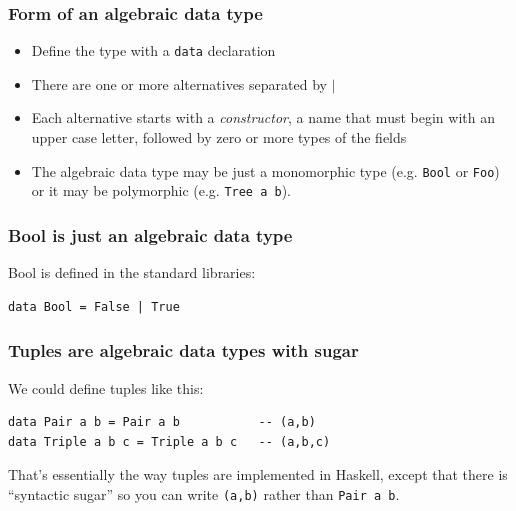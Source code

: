 \documentclass{beamer}
\begin{document}
\begin{frame}
\frametitle{Form of an algebraic data type}

\begin{itemize}
\item Define the type with a \texttt{data} declaration
\item There are one or more alternatives separated by $\mid$
\item Each alternative starts with a \emph{constructor}, a name
  that must begin with an upper case letter, followed by zero or
  more types of the fields
\item The algebraic data type may be just a monomorphic type
  (e.g. \texttt{Bool} or \texttt{Foo}) or it may be polymorphic (e.g. \texttt{Tree a b}).
\end{itemize}

\end{frame}

\begin{frame}[fragile]
\frametitle{Bool is just an algebraic data type}

Bool is defined in the standard libraries:

\begin{verbatim}
data Bool = False | True
\end{verbatim}

\end{frame}

\begin{frame}[fragile]
\frametitle{Tuples are algebraic data types with sugar}

We could define tuples like this:

\begin{verbatim}
data Pair a b = Pair a b           -- (a,b)
data Triple a b c = Triple a b c   -- (a,b,c)
\end{verbatim}

That's essentially the way tuples are implemented in Haskell,
except that there is ``syntactic sugar'' so you can write \texttt{(a,b)}
rather than \texttt{Pair a b}.

\end{frame}
\end{document}
